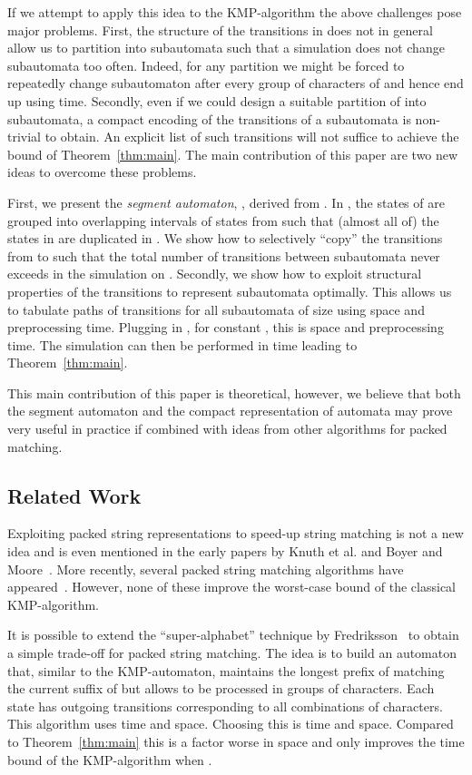 \documentclass{article}
\begin{document}
If we attempt to apply this idea to the KMP-algorithm the above
challenges pose major problems. First, the structure of the
transitions in  does not in general allow us to partition  into
subautomata such that a simulation does not change subautomata too
often. Indeed, for any partition we might be forced to repeatedly
change subautomaton after every group of  characters of  and
hence end up using  time. Secondly, even if we could design
a suitable partition of  into subautomata, a compact encoding of
the transitions of a subautomata is non-trivial to obtain. An explicit
list of such transitions will not suffice to achieve the bound of
Theorem~\ref{thm:main}. The main contribution of this paper are two
new ideas to overcome these problems.


First, we present the \emph{segment automaton}, , derived from .
In , the states of  are grouped into overlapping intervals of  states from  such that (almost all
of) the states in  are duplicated in . We show how to
selectively ``copy'' the transitions from  to  such that the
total number of transitions between subautomata never exceeds 
in the simulation on . Secondly, we show how to exploit structural
properties of the transitions to represent subautomata optimally. This
allows us to tabulate paths of transitions for all subautomata of size
 using  space and preprocessing time. Plugging in
, for constant ,
this is  space and preprocessing time. The
simulation can then be performed in time  leading to Theorem~\ref{thm:main}.

This main contribution of this paper is theoretical, however, we
believe that both the segment automaton and the compact representation
of automata may prove very useful in practice if combined with ideas
from other algorithms for packed matching.


\subsection{Related Work}
Exploiting packed string representations to speed-up string matching
is not a new idea and is even mentioned in the early papers by Knuth
et al. and Boyer and Moore~\cite{KMP1977, BM1977}. More recently,
several packed string matching algorithms have
appeared~\cite{BaezaYates1989b, TP1997,
  Fredriksson2002,Fredriksson2003, KBN2007,FL2009, FL2009a}. However,
none of these improve the worst-case  bound of the classical
KMP-algorithm.

It is possible to extend the ``super-alphabet'' technique by
Fredriksson~\cite{Fredriksson2002, Fredriksson2003} to obtain a simple
trade-off for packed string matching. The idea is to build an
automaton that, similar to the KMP-automaton, maintains the longest
prefix of  matching the current suffix of  but allows  to be
processed in groups of  characters. Each state has 
outgoing transitions corresponding to all combinations of 
characters. This algorithm uses  time and
 space. Choosing  this
is  time and 
space. Compared to Theorem~\ref{thm:main} this is a factor 
worse in space and only improves the  time bound of the
KMP-algorithm when .
\end{document}
